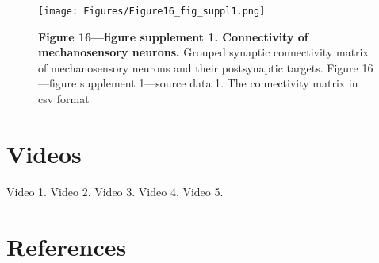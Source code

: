 \documentclass[
  11pt,
]{article}
\begin{document}
\begin{figure}[H]

{\centering \texttt{[image: Figures/Figure16\_fig\_suppl1.png]}

}

\caption{\textbf{Figure 16---figure supplement 1. Connectivity of
mechanosensory neurons. } Grouped synaptic connectivity matrix of
mechanosensory neurons and their postsynaptic targets. Figure
16---figure supplement 1---source data 1. The connectivity matrix in csv
format}

\end{figure}%

\section{Videos}\label{videos}

Video 1. Video 2. Video 3. Video 4. Video 5.

\hfill\break

\section{References}\label{references}

\hfill\break
\end{document}
